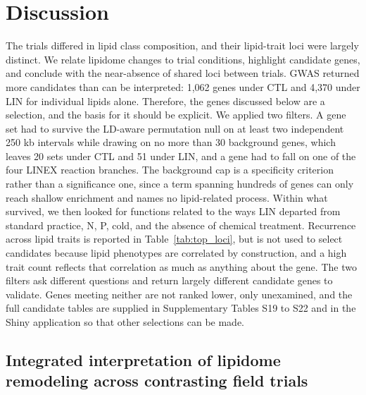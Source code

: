 \documentclass[9pt,twocolumn,twoside]{rilabRxiv}
\begin{document}
\section{Discussion}

The trials differed in lipid class composition, and their lipid-trait loci were largely distinct. We relate lipidome changes to trial conditions, highlight candidate genes, and conclude with the near-absence of shared loci between trials. GWAS returned more candidates than can be interpreted: 1,062 genes under CTL and 4,370 under LIN for individual lipids alone. Therefore, the genes discussed below are a selection, and the basis for it should be explicit. We applied two filters. A gene set had to survive the LD-aware permutation null on at least two independent 250 kb intervals while drawing on no more than 30 background genes, which leaves 20 sets under CTL and 51 under LIN, and a gene had to fall on one of the four LINEX reaction branches. The background cap is a specificity criterion rather than a significance one, since a term spanning hundreds of genes can only reach shallow enrichment and names no lipid-related process. Within what survived, we then looked for functions related to the ways LIN departed from standard practice, N, P, cold, and the absence of chemical treatment. Recurrence across lipid traits is reported in Table~\ref{tab:top_loci}, but is not used to select candidates because lipid phenotypes are correlated by construction, and a high trait count reflects that correlation as much as anything about the gene. The two filters ask different questions and return largely different candidate genes to validate. Genes meeting neither are not ranked lower, only unexamined, and the full candidate tables are supplied in Supplementary Tables S19 to S22 and in the Shiny application so that other selections can be made.

\subsection*{Integrated interpretation of lipidome remodeling across contrasting field trials}
\end{document}
